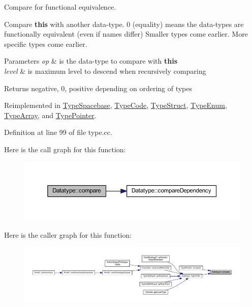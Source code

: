 Compare for functional equivalence. 

Compare {\bfseries{this}} with another data-\/type. 0 (equality) means the data-\/types are functionally equivalent (even if names differ) Smaller types come earlier. More specific types come earlier. 
\begin{DoxyParams}{Parameters}
{\em op} & is the data-\/type to compare with {\bfseries{this}} \\
\hline
{\em level} & is maximum level to descend when recursively comparing \\
\hline
\end{DoxyParams}
\begin{DoxyReturn}{Returns}
negative, 0, positive depending on ordering of types 
\end{DoxyReturn}


Reimplemented in \mbox{\hyperlink{class_type_spacebase_a1ec8296bec1fe983feba0dff1cd78b41}{Type\+Spacebase}}, \mbox{\hyperlink{class_type_code_a96f56d57d3c88430321564e01dc1ad90}{Type\+Code}}, \mbox{\hyperlink{class_type_struct_a7f06b400a7d74394512a9f67ec925310}{Type\+Struct}}, \mbox{\hyperlink{class_type_enum_acf43c87e14ab5b8e128fb35d86059bc5}{Type\+Enum}}, \mbox{\hyperlink{class_type_array_a25246a42499f1bc0f9a6c8c5f8224c74}{Type\+Array}}, and \mbox{\hyperlink{class_type_pointer_aba4a7c8c334a37a2225ec32c7328e402}{Type\+Pointer}}.



Definition at line 99 of file type.\+cc.

Here is the call graph for this function\+:
\nopagebreak
\begin{figure}[H]
\begin{center}
\leavevmode
\includegraphics[width=350pt]{class_datatype_a4d5a102b2d909180c3080fdb55d7b305_cgraph}
\end{center}
\end{figure}
Here is the caller graph for this function\+:
\nopagebreak
\begin{figure}[H]
\begin{center}
\leavevmode
\includegraphics[width=350pt]{class_datatype_a4d5a102b2d909180c3080fdb55d7b305_icgraph}
\end{center}
\end{figure}
\mbox{\label{class_datatype_ab26e4ca2c3091d3c5a34b4fbd7be76ae}} 

